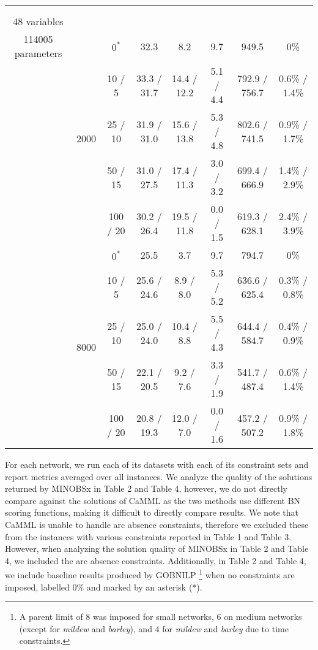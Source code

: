 \documentclass[twoside,11pt]{article}
\begin{document}
\begin{table}[H]
\begin{tabular}{ c | c | c || c | c | c | c | c  }
\hhline{=|=|=||=|=|=|=|=}
\multirow{10}{*}{\thead{\textbf{barley} \\ \\ 48 variables \\ 114005 parameters}} & \multirow{5}{*}{2000} 
& $0^*$ & 32.3 & 8.2 & 9.7 & 949.5 & 0\% \\
& & 10 / 5 & 33.3 / 31.7 & 14.4 / 12.2 & 5.1 / 4.4 & 792.9 / 756.7 & 0.6\% / 1.4\% \\
& & 25 / 10 & 31.9 / 31.0 & 15.6 / 13.8 & 5.3 / 4.8 & 802.6 / 741.5 & 0.9\% / 1.7\% \\
& & 50 / 15 & 31.0 / 27.5 & 17.4 / 11.3 & 3.0 / 3.2 & 699.4 / 666.9 & 1.4\% / 2.9\% \\
& & 100 / 20 & 30.2 / 26.4 & 19.5 / 11.8 & 0.0 / 1.5 & 619.3 / 628.1 & 2.4\% / 3.9\% \\


\hhline{~|-|-||-|-|-|-|-} 
& \multirow{5}{*}{8000}
& $0^*$ & 25.5 & 3.7 & 9.7 & 794.7 & 0\% \\
& & 10 / 5 & 25.6 / 24.6 & 8.9 / 8.0 & 5.3 / 5.2 & 636.6 / 625.4 & 0.3\% / 0.8\% \\
& & 25 / 10 & 25.0 / 24.0 & 10.4 / 8.8 & 5.5 / 4.3 & 644.4 / 584.7 & 0.4\% / 0.9\% \\
& & 50 / 15 & 22.1 / 20.5 & 9.2 / 7.6 & 3.3 / 1.9 & 541.7 / 487.4 & 0.6\% / 1.4\% \\
& & 100 / 20 & 20.8 / 19.3 & 12.0 / 7.0 & 0.0 / 1.6 & 457.2 / 507.2 & 0.9\% / 1.8\% \\

\end{tabular}
\end{table}

For each network, we run each of its datasets with each of its constraint sets and report metrics averaged over all instances.
We analyze the quality of the solutions returned by MINOBSx in Table 2 and Table 4, however, we do not directly compare against the solutions of CaMML as the two methods use 
different BN scoring functions, making it difficult to directly compare results. 
We note that CaMML is unable to handle arc absence constraints, therefore we excluded these from the instances with various constraints reported in Table 1 and Table 3. However,
when analyzing the solution quality of MINOBSx in Table 2 and Table 4, we included the arc absence constraints. Additionally, in Table 2 and Table 4, we include baseline results
produced by GOBNILP \footnote{A parent limit of 8 was imposed for small networks, 6 on medium networks (except for \emph{mildew} and \emph{barley}), and 4 for
\emph{mildew} and \emph{barley} due to time constraints. } when no constraints are imposed, labelled $0\%$ and marked by an asterisk (*).
\end{document}
